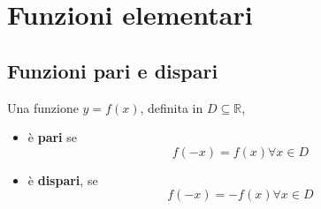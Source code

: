 \documentclass{book}
\begin{document}
\section{Funzioni elementari}
\begin{definition}
    \subsection{Funzioni pari e dispari}
    Una funzione \( y = f(x) \), definita in \( D \subseteq \mathbb{R} \),
    \begin{itemize}
        \item è \textbf{pari} se \[ f(-x) = f(x) \forall  x \in D \]
        \item è \textbf{dispari}, se \[ f(-x) = -f(x) \forall  x \in D \]
    \end{itemize}
\end{definition}
\end{document}
